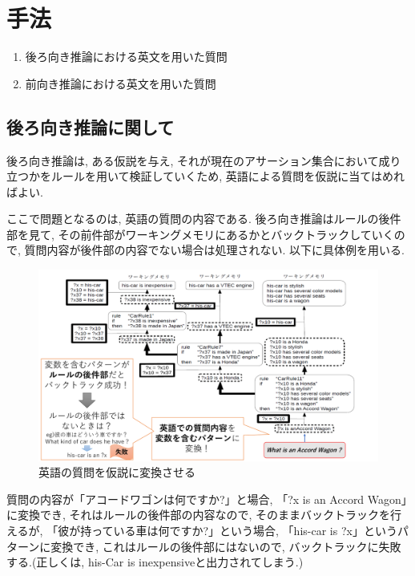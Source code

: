 \documentclass[uplatex,12pt]{jsarticle}
\begin{document}
\section{手法}
\begin{enumerate}
\item 後ろ向き推論における英文を用いた質問
\item 前向き推論における英文を用いた質問
\end{enumerate}

\subsection{後ろ向き推論に関して}
後ろ向き推論は, ある仮説を与え, それが現在のアサーション集合において成り立つかをルールを用いて検証していくため, 英語による質問を仮説に当てはめればよい.

ここで問題となるのは, 英語の質問の内容である. 後ろ向き推論はルールの後件部を見て, その前件部がワーキングメモリにあるかとバックトラックしていくので, 質問内容が後件部の内容でない場合は処理されない. 以下に具体例を用いる.

\begin{figure}[htbp]
 \begin{center}
  \includegraphics[width = 12cm, pagebox = cropbox, clip]{images/後ろ向き推論_仮説の立て方.pdf}
 \end{center}
 \caption[]{英語の質問を仮説に変換させる}\label{fig:fig1.1}
\end{figure}

質問の内容が「アコードワゴンは何ですか?」と場合, 「?x is an Accord Wagon」に変換でき, それはルールの後件部の内容なので, そのままバックトラックを行えるが, 「彼が持っている車は何ですか?」という場合, 「his-car is ?x」というパターンに変換でき, これはルールの後件部にはないので, バックトラックに失敗する.(正しくは, his-Car is inexpensiveと出力されてしまう.)
\end{document}
